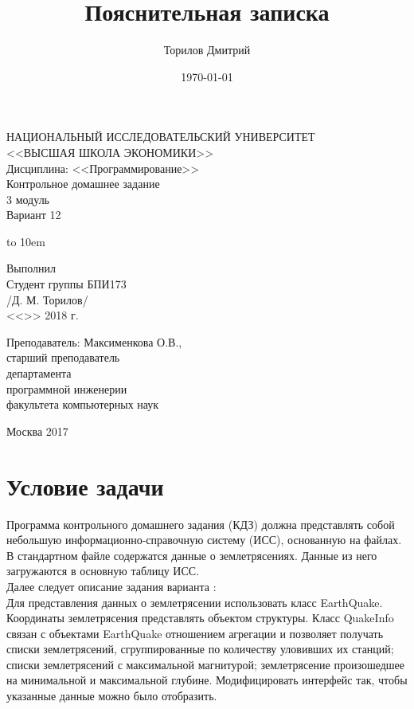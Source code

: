 \documentclass[a4paper,12pt, fleqn]{article}
\author{Торилов Дмитрий}
\title{Пояснительная записка}
\date{\today}
\theoremstyle{plain} %
\theoremstyle{definition} %
\theoremstyle{remark} %
\numberwithin{equation}{section}
\newcommand{\Ssign}{\underline{\hspace{8em}}}
\newcommand{\PeopleField}[1]{
	\vbox to 10em{
		#1\\
		<<\underline{\hspace{1.8em}}>>
		\underline{\hspace{10.5em}}
		2018 г.
	}
}
\begin{document}
\begin{titlepage}
		
	\large
	\begin{center}
		НАЦИОНАЛЬНЫЙ ИССЛЕДОВАТЕЛЬСКИЙ УНИВЕРСИТЕТ\\
		<<ВЫСШАЯ ШКОЛА ЭКОНОМИКИ>>\\
		Дисциплина: <<Программирование>>\\[10em]
		
		Контрольное домашнее задание\\
		3 модуль\\
		Вариант 12\\[7em]	
	\end{center}
	
	\begin{flushright}
		\PeopleField{
			Выполнил\\
			Студент группы БПИ173\\
			\Ssign /Д. М. Торилов/
		}
		
		Преподаватель: Максименкова О.В.,\\
		старший преподаватель\\
		департамента\\
		программной инженерии\\
		факультета компьютерных наук\\[7em]
	\end{flushright}
	
	\begin{center}
		Москва 2017	
	\end{center}
	
	\normalsize
	\newpage

\end{titlepage}

\setcounter{page}{2}
\tableofcontents
\newpage

\section{Условие задачи}
Программа контрольного домашнего задания (КДЗ) должна представлять собой небольшую информационно-справочную систему (ИСС), основанную на файлах. В стандартном файле содержатся данные о землетрясениях. Данные из него загружаются в основную таблицу ИСС.\\[1em]
Далее следует описание задания варианта :\\[1em]
Для представления данных о землетрясении использовать класс EarthQuake. Координаты землетрясения представлять объектом структуры. Класс QuakeInfo связан с объектами EarthQuake отношением агрегации и позволяет получать списки землетрясений, сгруппированные по количеству уловивших их станций; списки землетрясений с максимальной магнитурой; землетрясение произошедшее на минимальной и максимальной глубине. Модифицировать интерфейс так, чтобы указанные данные можно было отобразить.\\
\end{document}
